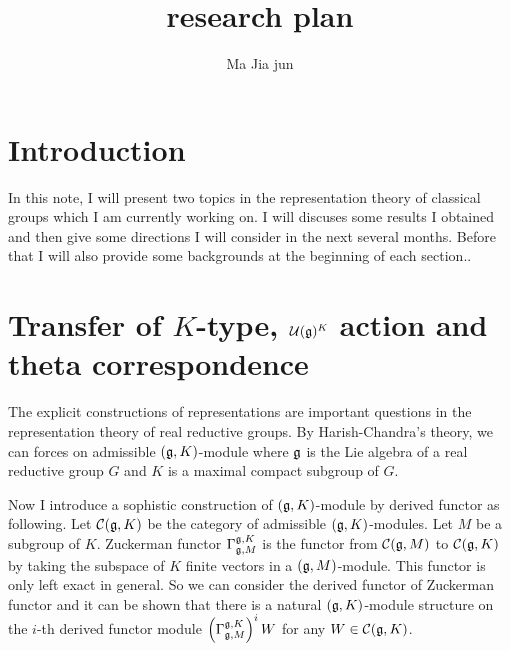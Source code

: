 \documentclass{amsart}
\begin{document}
\title{research plan}
\author{Ma Jia jun}
\maketitle

\section{Introduction}
In this note, I will present two topics in the representation theory of
classical groups which I am currently  working on. I will discuses
some results I obtained and then  give some 
directions I will consider in the next several months. Before that I
will also  provide some
backgrounds at the beginning of  each section..


\section{Transfer of $K$-type, $\mathcal{U}(\mathfrak{g})^K$ action and  theta correspondence}
The explicit constructions of representations are important questions
in the representation theory of real reductive groups. By
Harish-Chandra's theory, we can forces on admissible $(\mathfrak{g},K)$-module
where $\mathfrak{g}$ is the Lie algebra of a real reductive group $G$ and $K$ is
a maximal compact subgroup of $G$. 

Now I introduce a sophistic
construction of $(\mathfrak{g},K)$-module by derived functor as following.  Let
$\mathcal{C}(\mathfrak{g},K)$ be the category of admissible $(\mathfrak{g}, K)$-modules.  Let
$M$ be a subgroup of $K$.  Zuckerman functor
$\Gamma_{\mathfrak{g},M}^{\mathfrak{g},K}$ is the functor from $\mathcal{C}(\mathfrak{g},M)$ to $
\mathcal{C}(\mathfrak{g},K)$ by taking the subspace of $K$ finite vectors in a $(\mathfrak{g},
M)$-module.  This functor is only left exact in general.  So we can
consider the derived functor of Zuckerman functor and it can be shown
that there is a natural $(\mathfrak{g},K)$-module structure on the $i$-th
derived functor module 
$\left(\Gamma_{\mathfrak{g},M}^{\mathfrak{g},K}\right)^iW$ for any $W\in \mathcal{C}(\mathfrak{g},K)$.
\end{document}
